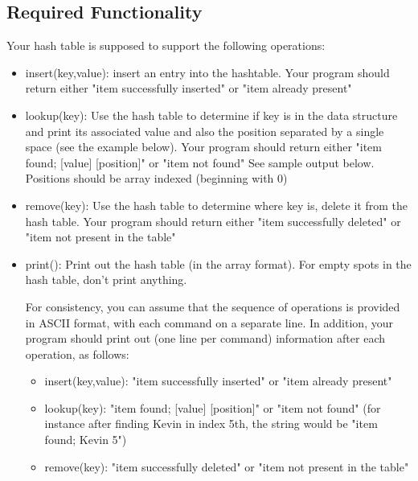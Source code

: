 \documentclass[times, 12pt]{article}
\begin{document}
\subsection*{Required Functionality}
Your hash table is supposed to support the following operations:\\
\begin{itemize}
    \item insert(key,value): insert an entry into the hashtable. Your program should return either "item successfully inserted" or "item already present"\\
    
    \item lookup(key): Use the hash table to determine if key is in the data structure and print its associated value and also the position separated by a single space (see the example below).
    Your program should return either "item found; [value] [position]" or "item not found" See sample output below. Positions should be array indexed (beginning with 0)\\
    
    \item remove(key): Use the hash table to determine where key is, delete it from the hash table. Your program should return either "item successfully deleted" or "item not present in the table"\\
    
    \item print(): Print out the hash table (in the array format). For empty spots in the hash table, don't print anything.
    
    For consistency, you can assume that the sequence of operations is provided in ASCII format,
    with each command on a separate line. In addition, your program should print out (one line per
    command) information after each operation, as follows:
    
    \begin{itemize}
        \item insert(key,value): "item successfully inserted" or "item already present"
        
        \item lookup(key): "item found; [value] [position]" or "item not found"
        (for instance after finding Kevin in index 5th, the string would be "item found; Kevin 5")
        
        \item remove(key): "item successfully deleted" or "item not present in the table"
        

\end{itemize}
\end{itemize}
\end{document}
